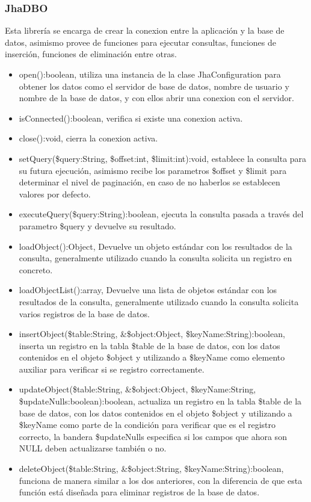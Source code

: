 \subsubsection{JhaDBO}
Esta librer\'ia se encarga de crear la conexion entre la aplicaci\'on y la base de datos, asimismo provee de funciones para ejecutar consultas, funciones de inserci\'on, funciones de eliminaci\'on entre otras.
\begin{itemize}
\item \textsf{open():boolean}, utiliza una instancia de la clase \textsf{JhaConfiguration} para obtener los datos como el servidor de base de datos, nombre de usuario y nombre de la base de datos, y con ellos abrir una conexion con el servidor.
\item \textsf{isConnected():boolean}, verifica si existe una conexion activa.
\item \textsf{close():void}, cierra la conexion activa.
\item \textsf{setQuery(\$query:String, \$offset:int, \$limit:int):void}, establece la consulta para su futura ejecuci\'on, asimismo recibe los parametros \textsf{\$offset} y \textsf{\$limit} para determinar el nivel de paginaci\'on, en caso de no haberlos se establecen valores por defecto.
\item \textsf{executeQuery(\$query:String):boolean}, ejecuta la consulta pasada a trav\'es del parametro \textsf{\$query} y devuelve su resultado.
\item \textsf{loadObject():Object}, Devuelve un objeto est\'andar con los resultados de la consulta, generalmente utilizado cuando la consulta solicita un registro en concreto.
\item \textsf{loadObjectList():array}, Devuelve una lista de objetos est\'andar con los resultados de la consulta, generalmente utilizado cuando la consulta solicita varios registros de la base de datos.
\item \textsf{insertObject(\$table:String, \&\$object:Object, \$keyName:String):boolean}, inserta un registro en la tabla \textsf{\$table} de la base de datos, con los datos contenidos en el objeto \textsf{\$object} y utilizando a \textsf{\$keyName} como elemento auxiliar para verificar si se registro correctamente.
\item \textsf{updateObject(\$table:String, \&\$object:Object, \$keyName:String, \$updateNulls:boolean):boolean}, actualiza un registro en la tabla \textsf{\$table} de la base de datos, con los datos contenidos en el objeto \textsf{\$object} y utilizando a \textsf{\$keyName} como parte de la condici\'on para verificar que es el registro correcto, la bandera \textsf{\$updateNulls} especifica si los campos que ahora son NULL deben actualizarse tambi\'en o no.
\item \textsf{deleteObject(\$table:String, \&\$object:String, \$keyName:String):boolean}, funciona de manera similar a los dos anteriores, con la diferencia de que esta funci\'on est\'a dise\~nada para eliminar registros de la base de datos.
\end{itemize}

